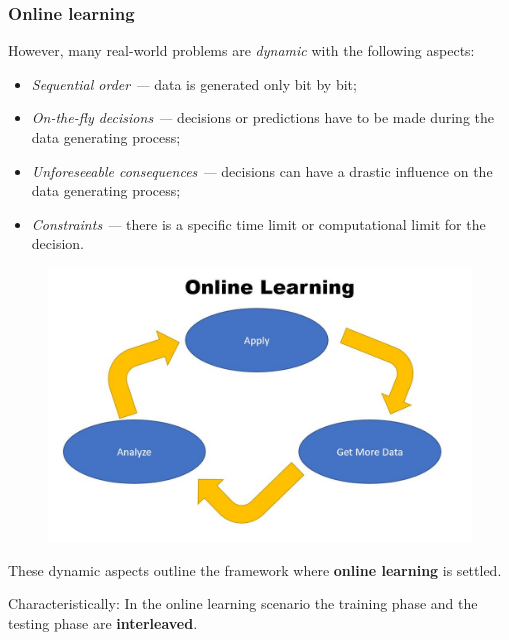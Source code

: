 \documentclass[11pt,compress,t,notes=noshow, xcolor=table]{beamer}
\begin{document}
\begin{frame}[t]
	\frametitle{Online learning}
%	
\begin{itemize} \small
%	
  	\item However, many real-world problems are \emph{dynamic} with the following aspects:
	\lz
	
	\begin{minipage}{.6\textwidth}
	\begin{itemize} \small
		\item \emph{Sequential order ---} data is generated only bit by bit;
		\item \emph{On-the-fly decisions ---} decisions or predictions have to be made during the data generating process;
		\item \emph{Unforeseeable consequences ---} decisions can have a drastic influence on the data generating process;
		\item \emph{Constraints ---} there is a specific time limit or computational limit for the decision.
	\end{itemize}
	\end{minipage}
	\begin{minipage}{.3\textwidth}
		\begin{figure}
		\centering
		\includegraphics[width=0.99\linewidth]{figure/online_learning}
		\end{figure}
	\end{minipage}
	\lz
	{ {	\item These dynamic aspects outline the framework where \textbf{online learning} is settled. 
	\item Characteristically: In the online learning scenario the training phase and the testing phase are \textbf{interleaved}.}}
	\end{itemize}
%	
\end{frame}
\end{document}
